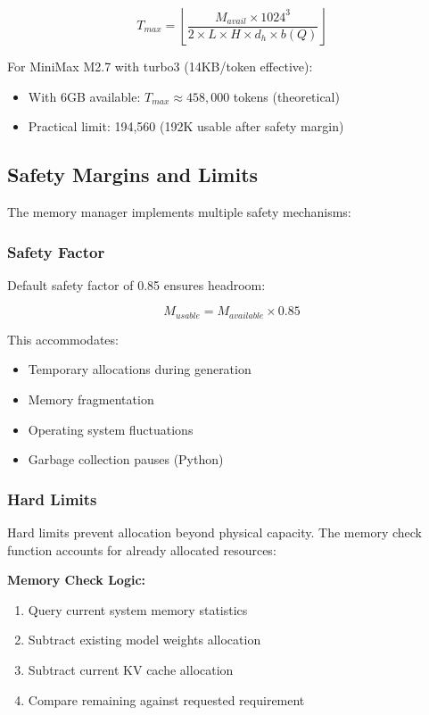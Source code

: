 \begin{equation}
T_{max} = \left\lfloor \frac{M_{avail} \times 1024^3}{2 \times L \times H \times d_h \times b(Q)} \right\rfloor
\end{equation}

For MiniMax M2.7 with turbo3 (14KB/token effective):

\begin{itemize}
    \item With 6GB available: $T_{max} \approx 458,000$ tokens (theoretical)
    \item Practical limit: 194,560 (192K usable after safety margin)
\end{itemize}

\subsection{Safety Margins and Limits}

The memory manager implements multiple safety mechanisms:

\subsubsection{Safety Factor}

Default safety factor of 0.85 ensures headroom:

\begin{equation}
M_{usable} = M_{available} \times 0.85
\end{equation}

This accommodates:
\begin{itemize}
    \item Temporary allocations during generation
    \item Memory fragmentation
    \item Operating system fluctuations
    \item Garbage collection pauses (Python)
\end{itemize}

\subsubsection{Hard Limits}

Hard limits prevent allocation beyond physical capacity. The memory check function accounts for already allocated resources:

\textbf{Memory Check Logic:}
\begin{enumerate}
    \item Query current system memory statistics
    \item Subtract existing model weights allocation
    \item Subtract current KV cache allocation
    \item Compare remaining against requested requirement
\end{enumerate}

